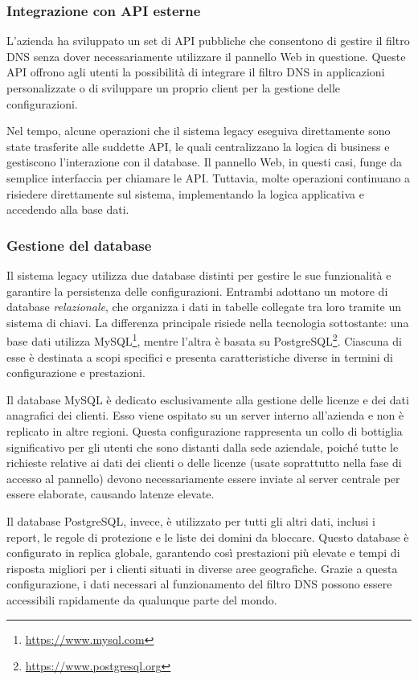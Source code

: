 \subsubsection{Integrazione con API esterne}
L'azienda ha sviluppato un set di API pubbliche che consentono di gestire il filtro DNS senza dover necessariamente utilizzare il pannello Web in questione. Queste API offrono agli utenti la possibilità di integrare il filtro DNS in applicazioni personalizzate o di sviluppare un proprio client per la gestione delle configurazioni.

Nel tempo, alcune operazioni che il sistema legacy eseguiva direttamente sono state trasferite alle suddette API, le quali centralizzano la logica di business e gestiscono l'interazione con il database. Il pannello Web, in questi casi, funge da semplice interfaccia per chiamare le API. Tuttavia, molte operazioni continuano a risiedere direttamente sul sistema, implementando la logica applicativa e accedendo alla base dati.

\subsubsection{Gestione del database}
Il sistema legacy utilizza due database distinti per gestire le sue funzionalità e garantire la persistenza delle configurazioni. Entrambi adottano un motore di database \emph{relazionale}, che organizza i dati in tabelle collegate tra loro tramite un sistema di chiavi. La differenza principale risiede nella tecnologia sottostante: una base dati utilizza MySQL\footnote{\url{https://www.mysql.com}}, mentre l’altra è basata su PostgreSQL\footnote{\url{https://www.postgresql.org}}. Ciascuna di esse è destinata a scopi specifici e presenta caratteristiche diverse in termini di configurazione e prestazioni.

Il database MySQL è dedicato esclusivamente alla gestione delle licenze e dei dati anagrafici dei clienti. Esso viene ospitato su un server interno all’azienda e non è replicato in altre regioni. Questa configurazione rappresenta un collo di bottiglia significativo per gli utenti che sono distanti dalla sede aziendale, poiché tutte le richieste relative ai dati dei clienti o delle licenze (usate soprattutto nella fase di accesso al pannello) devono necessariamente essere inviate al server centrale per essere elaborate, causando latenze elevate.

Il database PostgreSQL, invece, è utilizzato per tutti gli altri dati, inclusi i report, le regole di protezione e le liste dei domini da bloccare. Questo database è configurato in replica globale, garantendo così prestazioni più elevate e tempi di risposta migliori per i clienti situati in diverse aree geografiche. Grazie a questa configurazione, i dati necessari al funzionamento del filtro DNS possono essere accessibili rapidamente da qualunque parte del mondo.

